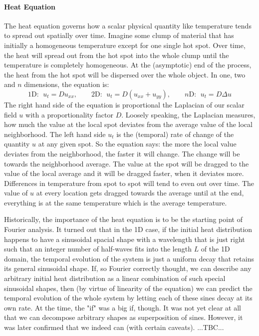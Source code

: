
\paragraph{Heat Equation} 
The heat equation governs how a scalar physical quantity like temperature tends to spread out spatially over time. Imagine some clump of material that has initially a homogeneous temperature except for one single hot spot. Over time, the heat will spread out from the hot spot into the whole clump until the temperature is completely homogeneous. At the (asymptotic) end of the process, the heat from the hot spot will be dispersed over the whole object. In one, two and $n$ dimensions, the equation is:
\begin{equation}
1\text{D: } \; u_{t} = D u_{xx} , \qquad 
2\text{D: } \; u_{t} = D (u_{xx} + u_{yy}), \qquad 
n\text{D: } \; u_{t} = D \Delta u
\end{equation}
The right hand side of the equation is proportional the Laplacian of our scalar field $u$ with a proportionality factor $D$. Loosely speaking, the Laplacian measures, how much the value at the local spot deviates from the average value of the local neighborhood. The left hand side $u_t$ is the (temporal) rate of change of the quantity $u$ at any given spot. So the equation says: the more the local value deviates from the neighborhood, the faster it will change. The change will be towards the neighborhood average. The value at the spot will be dragged to the value of the local average and it will be dragged faster, when it deviates more. Differences in temperature from spot to spot will tend to even out over time. The value of $u$ at every location gets dragged towards the average until at the end, everything is at the same temperature which is the average temperature. 

\medskip
Historically, the importance of the heat equation is to be the starting point of Fourier analysis. It turned out that in the 1D case, if the initial heat distribution happens to have a sinusoidal spacial shape with a wavelength that is just right such that an integer number of half-waves fits into the length $L$ of the 1D domain, the temporal evolution of the system is just a uniform decay that retains its general sinusoidal shape. If, so Fourier correctly thought, we can describe any arbitrary initial heat distribution as a linear combination of such special sinusoidal shapes, then (by virtue of linearity of the equation) we can predict the temporal evolution of the whole system by letting each of these sines decay at its own rate. At the time, the "if" was a big if, though. It was not yet clear at all that we can decompose arbitrary shapes as superposition of sines. However, it was later confirmed that we indeed can (with certain caveats). ...TBC...


